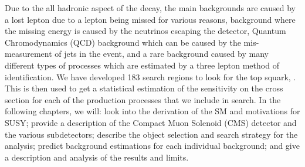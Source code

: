 Due to the all hadronic aspect of the decay, the main backgrounds are caused by a lost lepton due to a lepton being missed for various reasons, \Znunu{} background where the missing energy is caused by the neutrinos escaping the detector, Quantum Chromodynamics (QCD) background which can be caused by the mis-measurement of jets in the event, and a rare background caused by many different types of processes which are estimated by a three lepton method of identification. We have developed 183 search regions to look for the top squark, \st{}. This is then used to get a statistical estimation of the sensitivity on the cross section for each of the production processes that we include in search. In the following chapters, we will: look into the derivation of the SM and motivations for SUSY; provide a description of the Compact Muon Solenoid (CMS) detector and the various subdetectors; describe the object selection and search strategy for the analysis; predict background estimations for each individual background; and give a description and analysis of the results and limits. 

